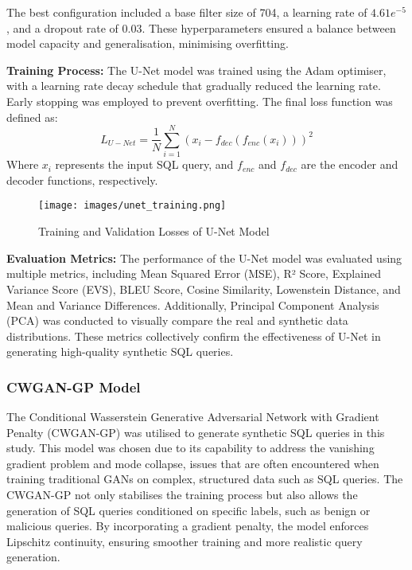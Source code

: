\documentclass[journal]{IEEEtran}
\begin{document}
The best configuration included a base filter size of 704, a learning rate of \(4.61e^{-5}\), and a dropout rate of 0.03. These hyperparameters ensured a balance between model capacity and generalisation, minimising overfitting.

\textbf{Training Process:} The U-Net model was trained using the Adam optimiser, with a learning rate decay schedule that gradually reduced the learning rate. Early stopping was employed to prevent overfitting. The final loss function was defined as:
\[
L_{U-Net} = \frac{1}{N} \sum_{i=1}^{N} \left( x_i - f_{dec}(f_{enc}(x_i)) \right)^2
\]
Where \( x_i \) represents the input SQL query, and \( f_{enc} \) and \( f_{dec} \) are the encoder and decoder functions, respectively.

\begin{figure}[H]
    \centering
    \texttt{[image: images/unet\_training.png]}
    \caption{Training and Validation Losses of U-Net Model}
    \label{fig:unet_loss}
\end{figure}

\textbf{Evaluation Metrics:} The performance of the U-Net model was evaluated using multiple metrics, including Mean Squared Error (MSE), R² Score, Explained Variance Score (EVS), BLEU Score, Cosine Similarity, Lowenstein Distance, and Mean and Variance Differences. Additionally, Principal Component Analysis (PCA) was conducted to visually compare the real and synthetic data distributions. These metrics collectively confirm the effectiveness of U-Net in generating high-quality synthetic SQL queries.

\subsubsection{CWGAN-GP Model }

The Conditional Wasserstein Generative Adversarial Network with Gradient Penalty (CWGAN-GP) was utilised to generate synthetic SQL queries in this study. This model was chosen due to its capability to address the vanishing gradient problem and mode collapse, issues that are often encountered when training traditional GANs on complex, structured data such as SQL queries. The CWGAN-GP not only stabilises the training process but also allows the generation of SQL queries conditioned on specific labels, such as benign or malicious queries. By incorporating a gradient penalty, the model enforces Lipschitz continuity, ensuring smoother training and more realistic query generation.
\end{document}

